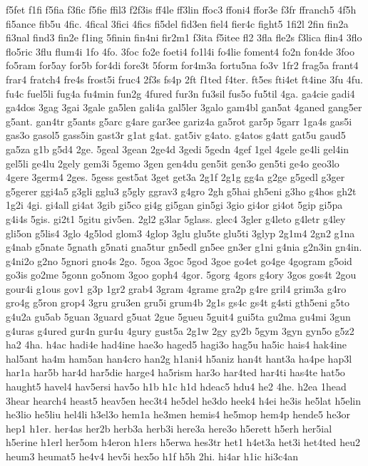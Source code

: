{f5fet
f1fi
f5fia
f3fic
f5fie
ffil3
f2f3is
ff4le
ff3lin
ffoc3
ffoni4
ffor3e
f3fr
ffranch5
4f5h
fi5ance
fib5u
4fic.
4fical
3fici
4fics
fi5del
fid3en
fiel4
fier4c
fight5
1fi2l
2fin
fin2a
fi3nal
find3
fin2e
f1ing
5finin
fin4ni
fir2m1
f3ita
f5itee
fl2
3fla
fle2s
f3lica
flin4
3flo
flo5ric
3flu
flum4i
1fo
4fo.
3foc
fo2e
foeti4
fo1l4i
fo4lie
foment4
fo2n
fon4de
3foo
fo5ram
for5ay
for5b
for4di
fore3t
5form
for4m3a
fortu5na
fo3v
1fr2
frag5a
frant4
frar4
fratch4
fre4s
frost5i
fruc4
2f3s
fs4p
2ft
f1ted
f4ter.
ft5es
fti4et
ft4ine
3fu
4fu.
fu4c
fuel5li
fug4a
fu4min
fun2g
4fured
fur3n
fu3sil
fus5o
fu5til
4ga.
ga4cie
gadi4
ga4dos
3gag
3gai
3gale
ga5len
gali4a
gal5ler
3galo
gam4bl
gan5at
4ganed
gang5er
g5ant.
gan4tr
g5ants
g5arc
g4are
gar3ee
gariz4a
ga5rot
gar5p
5garr
1ga4s
gas5i
gas3o
gasol5
gass5in
gast3r
g1at
g4at.
gat5iv
g4ato.
g4atos
g4att
gat5u
gaud5
ga5za
g1b
g5d4
2ge.
5geal
3gean
2ge4d
3gedi
5gedn
4gef
1gel
4gele
ge4li
gel4in
gel5li
ge4lu
2gely
gem3i
5gemo
3gen
gen4du
gen5it
gen3o
gen5ti
ge4o
geo3lo
4gere
3germ4
2ges.
5gess
gest5at
3get
get3a
2g1f
2g1g
gg4a
g2ge
g5gedl
g3ger
g5gerer
ggi4a5
g3gli
gglu3
g5gly
ggrav3
g4gro
2gh
g5hai
gh5eni
g3ho
g4hos
gh2t
1g2i
4gi.
gi4all
gi4at
3gib
gi5co
gi4g
gi5gan
gin5gi
3gio
gi4or
gi4ot
5gip
gi5pa
g4i4s
5gis.
gi2t1
5gitu
giv5en.
2gl2
g3lar
5glass.
glec4
3gler
g4leto
g4letr
g4ley
gli5on
g5lis4
3glo
4g5lod
glom3
4glop
3glu
glu5te
glu5ti
3glyp
2g1m4
2gn2
g1na
g4nab
g5nate
5gnath
g5nati
gna5tur
gn5edl
gn5ee
gn3er
g1ni
g4nia
g2n3in
gn4in.
g4ni2o
g2no
5gnori
gno4s
2go.
5goa
3goc
5god
3goe
go4et
go4ge
4gogram
g5oid
go3is
go2me
5gonn
go5nom
3goo
goph4
4gor.
5gorg
4gors
g4ory
3gos
gos4t
2gou
gour4i
g1ous
gov1
g3p
1gr2
grab4
3gram
4grame
gra2p
g4re
gril4
grim3a
g4ro
gro4g
g5ron
grop4
3gru
gru3en
gru5i
grum4b
2g1s
gs4c
gs4t
g4sti
gth5eni
g5to
g4u2a
gu5ab
5guan
3guard
g5uat
2gue
5gueu
5guit4
gui5ta
gu2ma
gu4mi
3gun
g4uras
g4ured
gur4n
gur4u
4gury
gust5a
2g1w
2gy
gy2b
5gym
3gyn
gyn5o
g5z2
ha2
4ha.
h4ac
hadi4e
had4ine
hae3o
haged5
hagi3o
hag5u
ha5ic
hais4
hak4ine
hal5ant
ha4m
ham5an
han4cro
han2g
h1ani4
h5aniz
han4t
hant3a
ha4pe
hap3l
har1a
har5b
har4d
har5die
harge4
ha5rism
har3o
har4ted
har4ti
has4te
hat5o
haught5
havel4
hav5ersi
hav5o
h1b
h1c
h1d
hdeac5
hdu4
he2
4he.
h2ea
1head
3hear
hearch4
heast5
heav5en
hec3t4
he5del
he3do
heek4
h4ei
he3is
he5lat
h5elin
he3lio
he5liu
hel4li
h3el3o
hem1a
he3men
hemis4
he5mop
hem4p
hende5
he3or
hep1
h1er.
her4as
her2b
herb3a
herb3i
here3a
here3o
h5erett
h5erh
her5ial
h5erine
h1erl
her5om
h4eron
h1ers
h5erwa
hes3tr
het1
h4et3a
het3i
het4ted
heu2
heum3
heumat5
he4v4
hev5i
hex5o
h1f
h5h
2hi.
hi4ar
h1ic
hi3c4an
}
